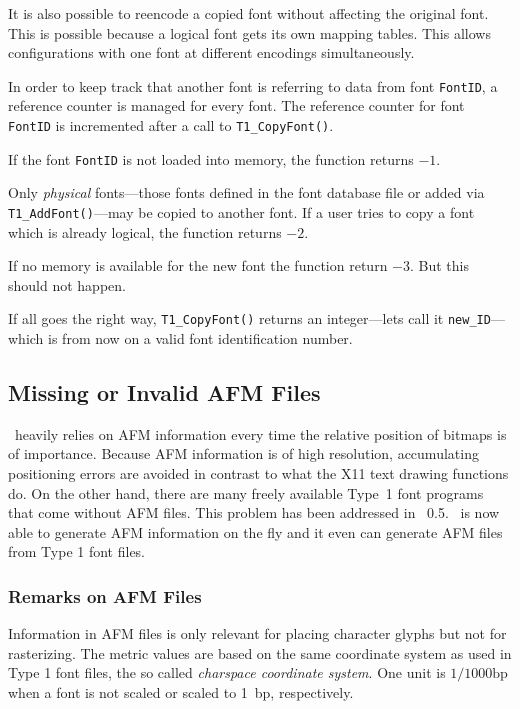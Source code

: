 It is also possible to reencode a copied font without affecting the
original font. This is possible because a logical font gets its own
mapping tables. This allows configurations with one font at different
encodings simultaneously.

In order to keep track that another font is referring to data from
font \verb+FontID+, a reference counter is managed for every font. The
reference counter for font \verb+FontID+ is incremented after a call to
\verb+T1_CopyFont()+. 

If the font \verb+FontID+ is not loaded into memory, the function returns $-1$.

Only {\em physical} fonts---those fonts defined in the font database
file or added via \verb+T1_AddFont()+---may be copied to another
font. If a user tries to copy a font 
which is already logical, the function returns $-2$.

If no memory is available for the new font the function return $-3$. But
this should not happen. 

If all goes the right way, \verb+T1_CopyFont()+ returns an integer---lets call
it \verb+new_ID+---which is from now on a valid font identification number.

\subsection{Missing or Invalid AFM Files}
\label{missingafmfiles}%
\tonelib\ heavily relies on AFM information every time the relative position
of bitmaps is of importance. Because AFM information is of high resolution,
accumulating positioning errors are avoided in contrast to what the X11 text
drawing functions do. On the other hand, there are many freely available
Type~1 font programs that come without AFM files. This problem has been
addressed in \tonelib\ 0.5. \tonelib\ is now able to generate AFM information
on the fly and it even can generate AFM files from Type 1 font files.

\subsubsection{Remarks on AFM Files}
\label{remarksonafmfiles}%
Information in AFM files is only relevant for placing character glyphs but not
for rasterizing. The metric values are based on the same coordinate system as
used in Type 1 font files, the so called {\em charspace coordinate system}. 
One unit is $1/1000 \mbox{bp}$ when a font is not scaled or scaled to 1~bp,
respectively. 

